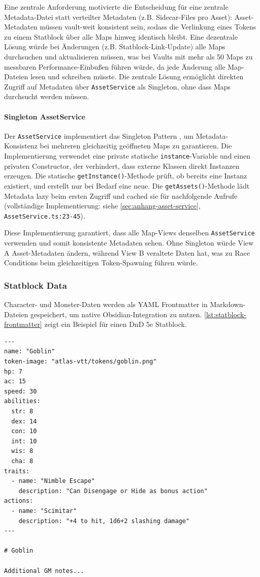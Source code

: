 Eine zentrale Anforderung motivierte die Entscheidung für eine zentrale Metadata-Datei statt verteilter Metadaten (z.B. Sidecar-Files pro Asset): Asset-Metadaten müssen vault-weit konsistent sein, sodass die Verlinkung eines Tokens zu einem Statblock über alle Maps hinweg identisch bleibt. Eine dezentrale Lösung würde bei Änderungen (z.B. Statblock-Link-Update) alle Maps durchsuchen und aktualisieren müssen, was bei Vaults mit mehr als 50 Maps zu messbaren Performance-Einbußen führen würde, da jede Änderung alle Map-Dateien lesen und schreiben müsste. Die zentrale Lösung ermöglicht direkten Zugriff auf Metadaten über \texttt{AssetService} als Singleton, ohne dass Maps durchsucht werden müssen.

\paragraph{Singleton AssetService}

Der \texttt{AssetService} implementiert das Singleton Pattern \autocite{RefactoringGuruSingleton}, um Metadata-Konsistenz bei mehreren gleichzeitig geöffneten Maps zu garantieren. Die Implementierung verwendet eine private statische \texttt{instance}-Variable und einen privaten Constructor, der verhindert, dass externe Klassen direkt Instanzen erzeugen. Die statische \texttt{getInstance()}-Methode prüft, ob bereits eine Instanz existiert, und erstellt nur bei Bedarf eine neue. Die \texttt{getAssets()}-Methode lädt Metadata lazy beim ersten Zugriff und cached sie für nachfolgende Aufrufe (vollständige Implementierung: siehe \autoref{sec:anhang-asset-service}, \texttt{AssetService.ts:23-45}).

Diese Implementierung garantiert, dass alle Map-Views denselben \texttt{AssetService} verwenden und somit konsistente Metadaten sehen. Ohne Singleton würde View A Asset-Metadaten ändern, während View B veraltete Daten hat, was zu Race Conditions beim gleichzeitigen Token-Spawning führen würde.

\subsubsection{Statblock Data}

Character- und Monster-Daten werden als \ac{YAML} Frontmatter in Markdown-Dateien gespeichert, um native Obsidian-Integration zu nutzen. \autoref{lst:statblock-frontmatter} zeigt ein Beispiel für einen \ac{DnD} 5e Statblock.

\begin{lstlisting}[float,language={},caption={Statblock YAML Frontmatter},label=lst:statblock-frontmatter]
---
name: "Goblin"
token-image: "atlas-vtt/tokens/goblin.png"
hp: 7
ac: 15
speed: 30
abilities:
  str: 8
  dex: 14
  con: 10
  int: 10
  wis: 8
  cha: 8
traits:
  - name: "Nimble Escape"
    description: "Can Disengage or Hide as bonus action"
actions:
  - name: "Scimitar"
    description: "+4 to hit, 1d6+2 slashing damage"
---

# Goblin

Additional GM notes...
\end{lstlisting}

